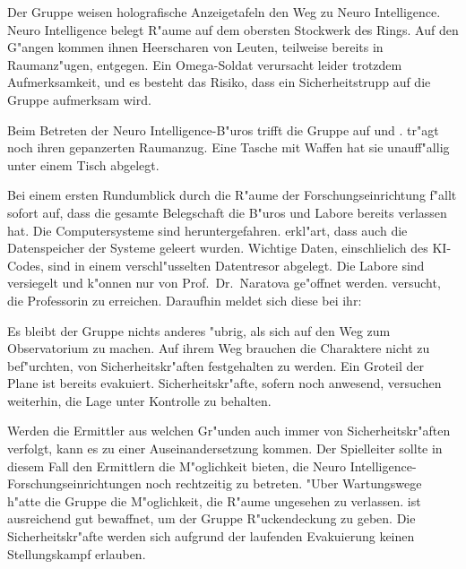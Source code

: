 Der Gruppe weisen holografische Anzeigetafeln den Weg zu Neuro Intelligence. Neuro Intelligence belegt R"aume auf dem obersten Stockwerk des Rings. Auf den G"angen kommen ihnen Heerscharen von Leuten, teilweise bereits in Raumanz"ugen, entgegen. Ein Omega-Soldat verursacht leider trotzdem Aufmerksamkeit, und es besteht das Risiko, dass ein Sicherheitstrupp auf die Gruppe aufmerksam wird.

Beim Betreten der Neuro Intelligence-B"uros trifft die Gruppe auf \xl{} und \ml{}. \xl{} tr"agt noch ihren gepanzerten Raumanzug. Eine Tasche mit Waffen hat sie unauff"allig unter einem Tisch abgelegt.

Bei einem ersten Rundumblick durch die R"aume der Forschungseinrichtung f"allt sofort auf, dass die gesamte Belegschaft die B"uros und Labore bereits verlassen hat. Die Computersysteme sind heruntergefahren. \ml{} erkl"art, dass auch die Datenspeicher der Systeme geleert wurden. Wichtige Daten, einschlie\3lich des KI-Codes, sind in einem verschl"usselten Datentresor abgelegt. Die Labore sind versiegelt und k"onnen nur von Prof.~Dr.~Naratova ge"offnet werden. \ml{} versucht, die Professorin zu erreichen. Daraufhin meldet sich diese bei ihr:


Es bleibt der Gruppe nichts anderes "ubrig, als sich auf den Weg zum Observatorium zu machen. Auf ihrem Weg brauchen die Charaktere nicht zu bef"urchten, von Sicherheitskr"aften festgehalten zu werden. Ein Gro\3teil der Plane ist bereits evakuiert. Sicherheitskr"afte, sofern noch anwesend, versuchen weiterhin, die Lage unter Kontrolle zu behalten.

\begin{remarks}
    Werden die Ermittler aus welchen Gr"unden auch immer von Sicherheitskr"aften verfolgt, kann es zu einer Auseinandersetzung kommen. Der Spielleiter sollte in diesem Fall den Ermittlern die M"oglichkeit bieten, die Neuro Intelligence-Forschungseinrichtungen noch rechtzeitig zu betreten. "Uber Wartungswege h"atte die Gruppe die M"oglichkeit, die R"aume ungesehen zu verlassen. \xl{} ist ausreichend gut bewaffnet, um der Gruppe R"uckendeckung zu geben. Die Sicherheitskr"afte werden sich aufgrund der laufenden Evakuierung keinen Stellungskampf erlauben.
\end{remarks}

